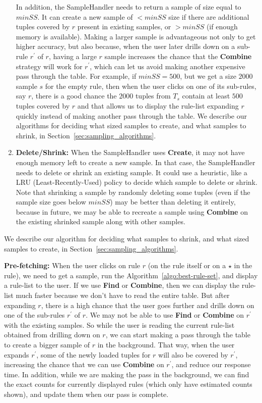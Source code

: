 \begin{enumerate}
In addition, the SampleHandler needs to return a sample of size equal to $minSS$. It can create a new sample of $< minSS$ size if there are additional tuples covered by $r$ present in existing samples, or $> minSS$ (if enough memory is available). Making a larger sample is advantageous not only to get higher accuracy, but also because, when the user later drills down on a sub-rule $r^{\prime}$ of $r$, having a large $r$ sample increases the chance that the \textbf{Combine} strategy will work for $r^{\prime}$, which can let us avoid making another expensive pass through the table. For example, if $minSS = 500$, but we get a size $2000$ sample $s$ for the empty rule, then when the user clicks on one of its sub-rules, say $r$, there is a good chance the $2000$ tuples from $T_s$ contain at least $500$ tuples covered by $r$ and that allows us to display the rule-list expanding $r$ quickly instead of making another pass through the table. We describe our algorithms for deciding what sized samples to create, and what samples to shrink, in Section~\ref{sec:sampling_algorithms}.

\item \textbf{Delete/Shrink:} When the SampleHandler uses \textbf{Create}, it may not have enough memory left to create a new sample. In that case, the SampleHandler needs to delete or shrink an existing sample. It could use a heuristic, like a LRU (Least-Recently-Used) policy to decide which sample to delete or shrink. Note that shrinking a sample by randomly deleting some tuples (even if the sample size goes below $minSS$) may be better than deleting it entirely, because in future, we may be able to recreate a sample using \textbf{Combine} on the existing shrinked sample along with other samples.
\end{enumerate}

We describe our algorithm for deciding what samples to shrink, and what sized samples to create, in Section~\ref{sec:sampling_algorithms}. 

\textbf{Pre-fetching:} When the user clicks on rule $r$ (on the rule itself or on a $\star$ in the rule), we need to get a sample, run the Algorithm~\ref{algo:best-rule-set}, and display a rule-list to the user. If we use \textbf{Find} or \textbf{Combine}, then we can display the rule-list much faster because we don't have to read the entire table. But after expanding $r$, there is a high chance that the user goes further and drills down on one of the sub-rules $r^{\prime}$ of $r$. We may not be able to use \textbf{Find} or \textbf{Combine} on $r^{\prime}$ with the existing samples. So while the user is reading the current rule-list obtained from drilling down on $r$, we can start making a pass through the table to create a bigger sample of $r$ in the background. That way, when the user expands $r^{\prime}$, some of the newly loaded tuples for $r$ will also be covered by $r^{\prime}$, increasing the chance that we can use \textbf{Combine} on $r^{\prime}$, and reduce our response time.
In addition, while we are making the pass in the background, we can find the exact counts for currently displayed rules (which only have estimated counts shown), and update them when our pass is complete.

